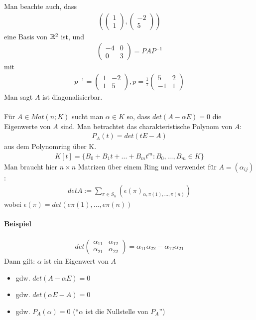 Man beachte auch, dass 
\begin{align}
(\begin{pmatrix} 1 \\ 1 \end{pmatrix}, \begin{pmatrix} -2 \\ 5 \end{pmatrix})
\end{align}
eine Basis von $\mathbb{R}^2$ ist, und 
\begin{align}
\begin{pmatrix} -4 & 0 \\ 0 & 3\end{pmatrix} = PAP^{-1}
\end{align}
mit 
\begin{align}
p^{-1} = \begin{pmatrix} 1 & -2 \\ 1 & 5 \end{pmatrix}, p = \frac{1}{7} \begin{pmatrix} 5 & 2 \\ -1 & 1 \end{pmatrix}
\end{align}
Man sagt $A$ ist \f{diagonalisierbar}. \\\\
Für $A \in Mat(n;K)$ sucht man $\alpha \in K$ so, dass $det(A - \alpha E) = 0$ die Eigenwerte von $A$ sind.
Man betrachtet das charakteristische Polynom von $A$:
\begin{align}
P_A(t) = det(t E - A)
\end{align}
aus dem Polynomring über K.
\begin{align}
K[t] = \{B_0 + B_1 t + ... + B_m t^m: B_0, ..., B_m \in K\}
\end{align}
Man braucht hier $n\times n$ Matrizen über einem Ring und verwendet für $A = (\alpha_{ij})$:
\begin{align}
det A := \sum_{\pi \in S_n} (\epsilon(\pi)_{ \alpha, \pi(1), ..., \pi(n)})
\end{align}
wobei $\epsilon(\pi) = det(e\pi(1), ..., e \pi(n))$

\paragraph{Beispiel}
\begin{align}
det \begin{pmatrix} \alpha_{11} & \alpha_{12} \\ \alpha_{21} & \alpha_{22} \end{pmatrix} = \alpha_{11}\alpha_{22} - \alpha_{12} \alpha_{21}
\end{align}
Dann gilt: $\alpha$ ist ein Eigenwert von $A$
\begin{itemize}
 \item gdw. $det(A - \alpha E) = 0$
 \item gdw. $det(\alpha E - A) = 0$
 \item gdw. $P_A(\alpha) = 0$ (``$\alpha$ ist die Nullstelle von $P_A$'')
\end{itemize} 

